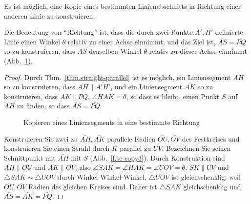 \begin{theorem}\label{thm.straight-direction}
Es ist möglich, eine Kopie eines bestimmten Linienabschnitts in Richtung einer anderen Linie zu konstruieren.
\end{theorem}

Die Bedeutung von ``Richtung'' ist, dass die durch zwei Punkte $A',H'$ definierte Linie einen Winkel $\theta$ relativ zu einer Achse einnimmt, und das Ziel ist, $\overline{AS}=\overline{PQ}$ so zu konstruieren, dass $\overline{AS}$ denselben Winkel $\theta$ relativ zu dieser Achse einnimmt (Abb.~\ref{f.se-copy1}).

\begin{proof}
Durch Thm.~\ref{thm.straight-parallel} ist es möglich, ein Liniensegment $\overline{AH}$ so zu konstruieren, dass $\overline{AH}\parallel\overline{A'H'}$, und ein Liniensegment $\overline{AK}$ so zu konstruieren, dass $\overline{AK}\parallel\overline{PQ}$.
$\angle HAK=\theta$, so dass es bleibt, einen Punkt $S$ auf $\overline{AH}$ zu finden, so dass $\overline{AS}=\overline{PQ}$.

\begin{figure}[t]
\begin{center}
\end{center}
\caption{Kopieren eines Liniensegments in eine bestimmte Richtung}\label{f.se-copy1}
\end{figure}

Konstruieren Sie zwei zu $\overline{AH}, \overline{AK}$ parallele Radien $\overline{OU}, \overline{OV}$ des Festkreises und konstruieren Sie einen Strahl durch $K$ parallel zu $\overline{UV}$. Bezeichnen Sie seinen Schnittpunkt mit $\overline{AH}$ mit $S$ (Abb.~\ref{f.se-copy3}). Durch Konstruktion sind $\overline{AH}\parallel\overline{OU}$ und $\overline{AK}\parallel\overline{OV}$, also $\angle SAK=\angle HAK=\angle UOV=\theta$. $\overline{SK}\parallel\overline{UV}$ und $\triangle SAK\sim\triangle UOV$ durch Winkel-Winkel-Winkel, $\triangle UOV$ ist gleichschenklig, weil $\overline{OU}, \overline{OV}$ Radien des gleichen Kreises sind. Daher ist $\triangle SAK$ gleichschenklig und $\overline{AS}=\overline{AK}=\overline{PQ}$.
\end{proof}

